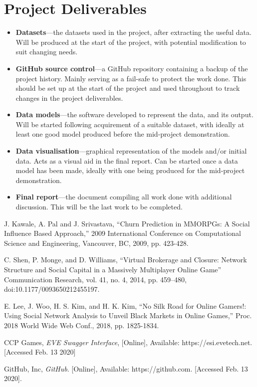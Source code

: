 \documentclass[]{article}
\begin{document}
\section{Project Deliverables}
\begin{itemize}
	\item \textbf{Datasets}---the datasets used in the project, after extracting the useful data.
	Will be produced at the start of the project, with potential modification to suit changing needs.
	
	\item \textbf{GitHub source control}---a GitHub \cite{gh} repository containing a backup of the project history.
	Mainly serving as a fail-safe to protect the work done.
	This should be set up at the start of the project and used throughout to track changes in the project deliverables.
	
	\item \textbf{Data models}---the software developed to represent the data, and its output.
	Will be started following acquirement of a suitable dataset, with ideally at least one good model produced before the mid-project demonstration.
	
	\item \textbf{Data visualisation}---graphical representation of the models and/or initial data.
	Acts as a visual aid in the final report.
	Can be started once a data model has been made, ideally with one being produced for the mid-project demonstration.
	
	\item \textbf{Final report}---the document compiling all work done with additional discussion.
	This will be the last work to be completed.

\end{itemize}

\vspace{1cm}
\begin{thebibliography}{9}
	J. Kawale, A. Pal and J. Srivastava,
	``Churn Prediction in MMORPGs: A Social Influence Based Approach,'' 2009 International Conference on Computational Science and Engineering,
	Vancouver, BC,
	2009,
	pp. 423-428.
	
	C. Shen, P. Monge, and D. Williams,
	``Virtual Brokerage and Closure: Network Structure and Social Capital in a Massively Multiplayer Online Game''
	Communication Research, vol. 41, no. 4,
	2014,
	pp. 459–480, 
	doi:10.1177/0093650212455197.
	
	E. Lee, J. Woo, H. S. Kim, and H. K. Kim,
	``No Silk Road for Online Gamers!: Using Social Network Analysis to Unveil Black Markets in Online Games,''
	Proc. 2018 World Wide Web Conf.,
	2018,
	pp. 1825-1834.
	
	CCP Games,
	\textit{EVE Swagger Interface},
	[Online],
	Available: https://esi.evetech.net.
	[Accessed Feb. 13 2020]
	
	GitHub, Inc,
	\textit{GitHub}.
	[Online],
	Available: https://github.com.
	[Accessed Feb. 13 2020].
	
\end{thebibliography}
\end{document}
